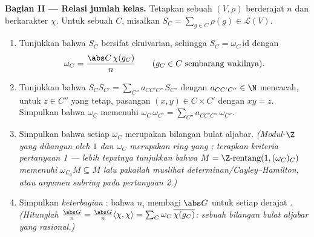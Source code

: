 \begin{problem}
\medskip
\noindent\textbf{Bagian II --- Relasi jumlah kelas.} Tetapkan sebuah
 $(V, \rho)$ berderajat $n$ dan berkarakter $\chi$. Untuk sebuah
 $C$, misalkan $S_C = \sum_{g \in C}\rho(g) \in
\mathcal L(V)$.
\begin{enumerate}[resume]
  \item Tunjukkan bahwa $S_C$ bersifat ekuivarian, sehingga $S_C =
        \omega_C\,\mathrm{id}$ dengan
        \[
        \omega_C = \frac{\abs C\,\chi(g_C)}{n}
        \qquad (g_C \in C \text{ sembarang wakilnya}).
        \]
  \item Tunjukkan bahwa $S_CS_{C'} = \sum_{C''}
        a_{CC'C''}\,S_{C''}$ dengan $a_{CC'C''} \in \N$ mencacah,
        untuk $z \in C''$ yang tetap, pasangan $(x, y) \in C \times
        C'$ dengan $xy = z$. Simpulkan bahwa $\omega_C$ memenuhi
        $\omega_C\,\omega_{C'} = \sum_{C''}
        a_{CC'C''}\,\omega_{C''}$.
  \item Simpulkan bahwa setiap $\omega_C$ merupakan bilangan bulat aljabar.
        \emph{(Modul-$\Z$ yang dibangun oleh $1$ dan
        $\omega_C$ merupakan ring yang ; terapkan kriteria
        pertanyaan 1 --- lebih tepatnya tunjukkan bahwa $M = \Z\text{-rentang}
        (1, (\omega_C)_C)$ memenuhi $\omega_{C_0} M \subseteq
        M$ lalu pakailah muslihat determinan/Cayley--Hamilton, atau
        argumen subring pada pertanyaan 2.)}
  \item Simpulkan \emph{keterbagian }: bahwa $n_i$ membagi
        $\abs G$ untuk setiap derajat .
        \emph{(Hitunglah $\frac{\abs G}{n} = \frac{\abs G}{n}
        \langle\chi,\chi\rangle = \sum_C \omega_C\,
        \overline{\chi(g_C)}$: sebuah bilangan bulat aljabar yang
        rasional.)}
\end{enumerate}


\end{problem}
